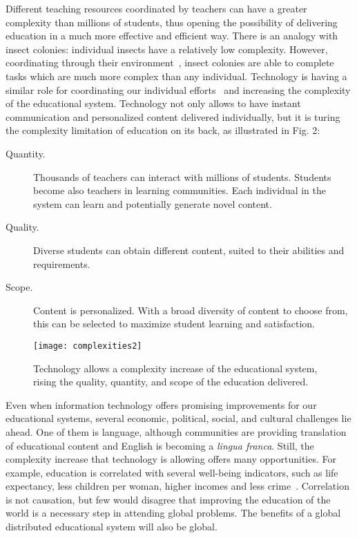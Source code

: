 \documentclass[12pt]{article}
\begin{document}
Different teaching resources coordinated by teachers can have a greater complexity than millions of students, thus opening the possibility of delivering education in a much more effective and efficient way. There is an analogy with insect colonies: individual insects have a relatively low complexity. However, coordinating through their environment~\cite{TheraulazBonabeau1999}, insect colonies are able to complete tasks which are much more complex than any individual. Technology is having a similar role for coordinating our individual efforts~\cite{Bernstein2012GlobalBrain} and increasing the complexity of the educational system. Technology not only allows to have instant communication and personalized content delivered individually, but it is turing the complexity limitation of education on its back, as illustrated in Fig. 2:

\begin{description}
\item [Quantity.] Thousands of teachers can interact with millions of students. Students become also teachers in learning communities. Each individual in the system can learn and potentially generate novel content. 
\item [Quality.] Diverse students can obtain different content, suited to their abilities and requirements.
\item [Scope.] Content is personalized. With a broad diversity of content to choose from, this can be selected to maximize student learning and satisfaction.
\end{description}




\begin{figure}[htbp]
\begin{center}
  \texttt{[image: complexities2]}\\
\caption{Technology allows a complexity increase of the educational system, rising the quality, quantity, and scope of the education delivered.}
\label{fig:cx2}
\end{center}
\end{figure}


Even when information technology offers promising improvements for our educational systems, several economic, political, social, and cultural challenges lie ahead. One of them is language, although communities are providing translation of educational content and English is becoming a \emph{lingua franca}.
Still, the complexity increase that technology is allowing offers many opportunities. For example, education is correlated with several well-being indicators, such as life expectancy, less children per woman, higher incomes and less crime~\cite{Gapminder}. Correlation is not causation, but few would disagree that improving the education of the world is a necessary step in attending global problems. 
The benefits of a global distributed educational system will also be global. 
\end{document}
